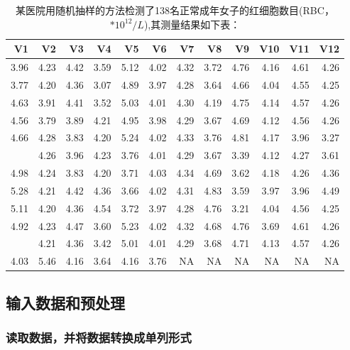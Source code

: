 \documentclass[
]{article}
\begin{document}
\begin{table}

\caption{\label{tab:tab1}某医院用随机抽样的方法检测了138名正常成年女子的红细胞数目(RBC， $*10^{12}/L$),其测量结果如下表：}
\centering
\begin{tabular}[t]{rrrrrrrrrrrr}
\toprule
V1 & V2 & V3 & V4 & V5 & V6 & V7 & V8 & V9 & V10 & V11 & V12\\
\midrule
3.96 & 4.23 & 4.42 & 3.59 & 5.12 & 4.02 & 4.32 & 3.72 & 4.76 & 4.16 & 4.61 & 4.26\\
3.77 & 4.20 & 4.36 & 3.07 & 4.89 & 3.97 & 4.28 & 3.64 & 4.66 & 4.04 & 4.55 & 4.25\\
4.63 & 3.91 & 4.41 & 3.52 & 5.03 & 4.01 & 4.30 & 4.19 & 4.75 & 4.14 & 4.57 & 4.26\\
4.56 & 3.79 & 3.89 & 4.21 & 4.95 & 3.98 & 4.29 & 3.67 & 4.69 & 4.12 & 4.56 & 4.26\\
4.66 & 4.28 & 3.83 & 4.20 & 5.24 & 4.02 & 4.33 & 3.76 & 4.81 & 4.17 & 3.96 & 3.27\\
\addlinespace
4.61 & 4.26 & 3.96 & 4.23 & 3.76 & 4.01 & 4.29 & 3.67 & 3.39 & 4.12 & 4.27 & 3.61\\
4.98 & 4.24 & 3.83 & 4.20 & 3.71 & 4.03 & 4.34 & 4.69 & 3.62 & 4.18 & 4.26 & 4.36\\
5.28 & 4.21 & 4.42 & 4.36 & 3.66 & 4.02 & 4.31 & 4.83 & 3.59 & 3.97 & 3.96 & 4.49\\
5.11 & 4.20 & 4.36 & 4.54 & 3.72 & 3.97 & 4.28 & 4.76 & 3.21 & 4.04 & 4.56 & 4.25\\
4.92 & 4.23 & 4.47 & 3.60 & 5.23 & 4.02 & 4.32 & 4.68 & 4.76 & 3.69 & 4.61 & 4.26\\
\addlinespace
3.89 & 4.21 & 4.36 & 3.42 & 5.01 & 4.01 & 4.29 & 3.68 & 4.71 & 4.13 & 4.57 & 4.26\\
4.03 & 5.46 & 4.16 & 3.64 & 4.16 & 3.76 & NA & NA & NA & NA & NA & NA\\
\bottomrule
\end{tabular}
\end{table}

\hypertarget{ux8f93ux5165ux6570ux636eux548cux9884ux5904ux7406}{%
\subsection{输入数据和预处理}\label{ux8f93ux5165ux6570ux636eux548cux9884ux5904ux7406}}

\hypertarget{ux8bfbux53d6ux6570ux636eux5e76ux5c06ux6570ux636eux8f6cux6362ux6210ux5355ux5217ux5f62ux5f0f}{%
\subsubsection{读取数据，并将数据转换成单列形式}\label{ux8bfbux53d6ux6570ux636eux5e76ux5c06ux6570ux636eux8f6cux6362ux6210ux5355ux5217ux5f62ux5f0f}}
\end{document}
